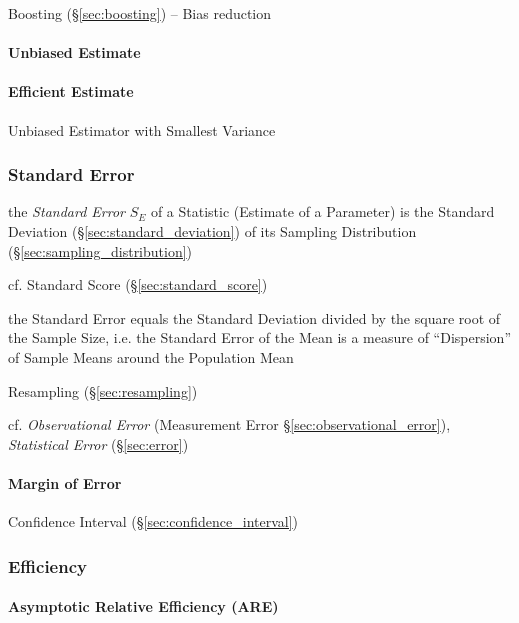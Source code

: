 Boosting (\S\ref{sec:boosting}) -- Bias reduction



\paragraph{Unbiased Estimate}\label{sec:unbiased_estimate}\hfill

\paragraph{Efficient Estimate}\label{sec:efficient_estimate}\hfill

Unbiased Estimator with Smallest Variance



\subsubsection{Standard Error}\label{sec:standard_error}

the \emph{Standard Error} $S_E$ of a Statistic (Estimate of a Parameter) is the
Standard Deviation (\S\ref{sec:standard_deviation}) of its Sampling Distribution
(\S\ref{sec:sampling_distribution})

cf. Standard Score (\S\ref{sec:standard_score})

the Standard Error equals the Standard Deviation divided by the square root of
the Sample Size, i.e. the Standard Error of the Mean is a measure of
``Dispersion'' of Sample Means around the Population Mean

\fist Resampling (\S\ref{sec:resampling})

\fist cf. \emph{Observational Error} (Measurement Error
\S\ref{sec:observational_error}), \emph{Statistical Error} (\S\ref{sec:error})



\paragraph{Margin of Error}\label{sec:margin_of_error}\hfill

\fist Confidence Interval (\S\ref{sec:confidence_interval})



\subsubsection{Efficiency}\label{sec:efficiency}

\paragraph{Asymptotic Relative Efficiency (ARE)}\label{sec:are}\hfill



